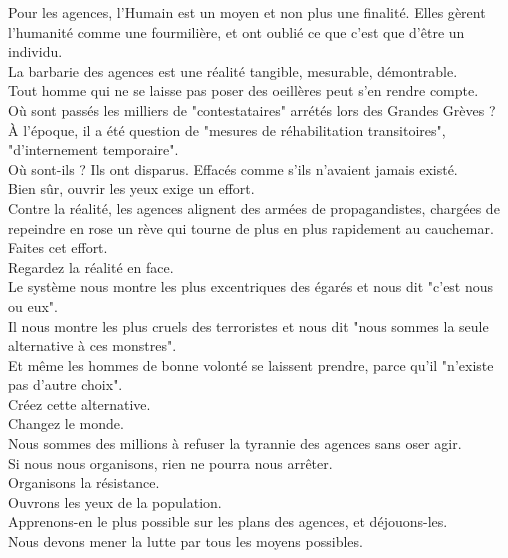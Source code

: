 \documentclass[11pt,twoside,a4paper]{article}
\begin{document}
\begin{multicols}{2}
Pour les agences, l'Humain est un moyen et non plus une finalit{\'e}. Elles g{\`e}rent l'humanit{\'e} comme une fourmili{\`e}re, et ont oubli{\'e} ce que c'est que d'{\^e}tre un individu. ~\\ 

La barbarie des agences est une r{\'e}alit{\'e} tangible, mesurable, d{\'e}montrable. ~\\
Tout homme qui ne se laisse pas poser des oeill{\`e}res peut s'en rendre compte. ~\\
O{\`u} sont pass{\'e}s les milliers de "contestataires" arr{\'e}t{\'e}s lors des Grandes Gr{\`e}ves ? ~\\ 
{\`A} l'{\'e}poque, il a {\'e}t{\'e} question de "mesures de r{\'e}habilitation transitoires", "d'internement temporaire". ~\\ 
O{\`u} sont-ils ? Ils ont disparus. Effac{\'e}s comme s'ils n'avaient jamais exist{\'e}. ~\\ 

Bien s{\^u}r, ouvrir les yeux exige un effort. ~\\
Contre la r{\'e}alit{\'e}, les agences alignent des arm{\'e}es de propagandistes, charg{\'e}es de repeindre en rose un r{\`e}ve qui tourne de plus en plus rapidement au cauchemar. ~\\ 
Faites cet effort. ~\\ 
Regardez la r{\'e}alit{\'e} en face. ~\\

Le syst{\`e}me nous montre les plus excentriques des {\'e}gar{\'e}s et nous dit "c'est nous ou eux". ~\\
Il nous montre les plus cruels des terroristes et nous dit "nous sommes la seule alternative {\`a} ces monstres". ~\\
Et m{\^e}me les hommes de bonne volont{\'e} se laissent prendre, parce qu'il "n'existe pas d'autre choix". ~\\

Cr{\'e}ez cette alternative. ~\\
Changez le monde. ~\\

Nous sommes des millions {\`a} refuser la tyrannie des agences sans oser agir. ~\\
Si nous nous organisons, rien ne pourra nous arr{\^e}ter. ~\\

Organisons la r{\'e}sistance. ~\\
Ouvrons les yeux de la population. ~\\
Apprenons-en le plus possible sur les plans des agences, et d{\'e}jouons-les. ~\\
Nous devons mener la lutte par tous les moyens possibles. ~\\


\end{multicols}
\end{document}
